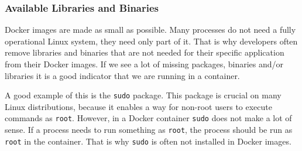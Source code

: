 \subsubsection{Available Libraries and Binaries}
Docker images are made as small as possible. Many processes do not need a fully operational Linux system, they need only part of it. That is why developers often remove libraries and binaries that are not needed for their specific application from their Docker images. If we see a lot of missing packages, binaries and/or libraries it is a good indicator that we are running in a container.

\hfill

A good example of this is the \lstinline{sudo} package. This package is crucial on many Linux distributions, because it enables a way for non-root users to execute commands as \lstinline{root}. However, in a Docker container \lstinline{sudo} does not make a lot of sense. If a process needs to run something as \lstinline{root}, the process should be run as \lstinline{root} in the container. That is why \lstinline{sudo} is often not installed in Docker images.
